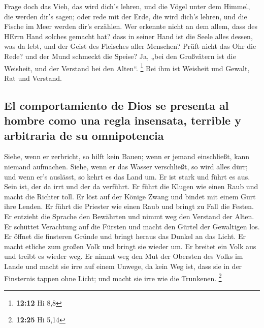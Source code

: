  Frage doch das Vieh, das wird dich's lehren, und die
Vögel unter dem Himmel, die werden dir's sagen;  oder rede
mit der Erde, die wird dich's lehren, und die Fische im Meer werden
dir's erzählen.  Wer erkennte nicht an dem allem, dass des
HErrn Hand solches gemacht hat?  dass in seiner Hand ist
die Seele alles dessen, was da lebt, und der Geist des Fleisches aller
Menschen?  Prüft nicht das Ohr die Rede? und der Mund
schmeckt die Speise?  Ja, „bei den Großvätern ist die
Weisheit, und der Verstand bei den Alten``. \footnote{\textbf{12:12} Hi
  8,8}  Bei ihm ist Weisheit und Gewalt, Rat und
Verstand.

\hypertarget{el-comportamiento-de-dios-se-presenta-al-hombre-como-una-regla-insensata-terrible-y-arbitraria-de-su-omnipotencia}{%
\subsection{El comportamiento de Dios se presenta al hombre como una
regla insensata, terrible y arbitraria de su
omnipotencia}\label{el-comportamiento-de-dios-se-presenta-al-hombre-como-una-regla-insensata-terrible-y-arbitraria-de-su-omnipotencia}}

 Siehe, wenn er zerbricht, so hilft kein Bauen; wenn er
jemand einschließt, kann niemand aufmachen.  Siehe, wenn
er das Wasser verschließt, so wird alles dürr; und wenn er's auslässt,
so kehrt es das Land um.  Er ist stark und führt es aus.
Sein ist, der da irrt und der da verführt.  Er führt die
Klugen wie einen Raub und macht die Richter toll.  Er
löst auf der Könige Zwang und bindet mit einem Gurt ihre Lenden.
 Er führt die Priester wie einen Raub und bringt zu Fall
die Festen.  Er entzieht die Sprache den Bewährten und
nimmt weg den Verstand der Alten.  Er schüttet Verachtung
auf die Fürsten und macht den Gürtel der Gewaltigen los. 
Er öffnet die finsteren Gründe und bringt heraus das Dunkel an das
Licht.  Er macht etliche zum großen Volk und bringt sie
wieder um. Er breitet ein Volk aus und treibt es wieder weg.
 Er nimmt weg den Mut der Obersten des Volks im Lande und
macht sie irre auf einem Unwege, da kein Weg ist,  dass
sie in der Finsternis tappen ohne Licht; und macht sie irre wie die
Trunkenen. \footnote{\textbf{12:25} Hi 5,14}


